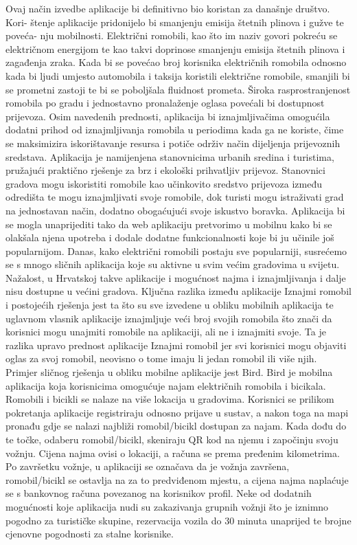 		Ovaj način izvedbe aplikacije bi definitivno bio koristan za današnje društvo. Kori- štenje aplikacije pridonijelo bi smanjenju emisija štetnih plinova i gužve te poveća- nju mobilnosti. Električni romobili, kao što im naziv govori pokreću se električnom energijom te kao takvi doprinose smanjenju emisija štetnih plinova i zagađenja zraka. Kada bi se povećao broj korisnika električnih romobila odnosno kada bi ljudi umjesto automobila i taksija koristili električne romobile, smanjili bi se prometni zastoji te bi se poboljšala fluidnost prometa. Široka rasprostranjenost romobila po gradu i jednostavno pronalaženje oglasa povećali bi dostupnost prijevoza. Osim navedenih prednosti, aplikacija bi iznajmljivačima omogućila dodatni prihod od iznajmljivanja romobila u periodima kada ga ne koriste, čime se maksimizira iskorištavanje resursa i potiče održiv način dijeljenja prijevoznih sredstava. Aplikacija je namijenjena stanovnicima urbanih sredina i turistima, pružajući praktično rješenje za brz i ekološki prihvatljiv prijevoz. Stanovnici gradova mogu iskoristiti romobile kao učinkovito sredstvo prijevoza između odredišta te mogu iznajmljivati svoje romobile, dok turisti mogu istraživati grad na jednostavan način, dodatno obogaćujući svoje iskustvo boravka. Aplikacija bi se mogla unaprijediti tako da web aplikaciju pretvorimo u mobilnu kako bi se olakšala njena upotreba i dodale dodatne funkcionalnosti koje bi ju učinile još popularnijom.  
		\newline
		\newline
		Danas, kako električni romobili postaju sve popularniji, susrećemo se s mnogo sličnih aplikacija koje su aktivne u svim većim gradovima u svijetu. Nažalost, u Hrvatskoj takve aplikacije i mogućnost najma i iznajmljivanja i dalje nisu dostupne u većini gradova. Ključna razlika između aplikacije Iznajmi romobil i postojećih rješenja jest ta što su sve izvedene u obliku mobilnih aplikacija te uglavnom vlasnik aplikacije iznajmljuje veći broj svojih romobila što znači da korisnici mogu unajmiti romobile na aplikaciji, ali ne i iznajmiti svoje. Ta je razlika upravo prednost aplikacije Iznajmi romobil jer svi korisnici mogu objaviti oglas za svoj romobil, neovisno o tome imaju li jedan romobil ili više njih. Primjer sličnog rješenja u obliku mobilne aplikacije jest Bird. Bird je mobilna aplikacija koja korisnicima omogućuje najam električnih romobila i bicikala. Romobili i bicikli se nalaze na više lokacija u gradovima. Korisnici se prilikom pokretanja aplikacije registriraju odnosno prijave u sustav, a nakon toga na mapi pronađu gdje se nalazi najbliži romobil/bicikl dostupan za najam. Kada dođu do te točke, odaberu romobil/bicikl, skeniraju QR kod na njemu i započinju svoju vožnju. Cijena najma ovisi o lokaciji, a računa se prema pređenim kilometrima. Po završetku vožnje, u aplikaciji se označava da je vožnja završena, romobil/bicikl se ostavlja na za to predviđenom mjestu, a cijena najma naplaćuje se s bankovnog računa povezanog na korisnikov profil. Neke od dodatnih mogućnosti koje aplikacija nudi su zakazivanja grupnih vožnji što je iznimno pogodno za turističke skupine, rezervacija vozila do 30 minuta unaprijed te brojne cjenovne pogodnosti za stalne korisnike.
		
